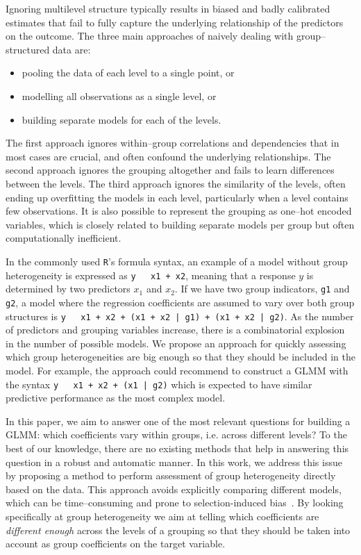 \documentclass{article}
\begin{document}
Ignoring multilevel structure typically results in biased and badly calibrated estimates that fail to fully capture the underlying relationship of the predictors on the outcome.
%
The three main approaches of naively dealing with group--structured data are:
\begin{itemize}[topsep=0pt,itemsep=2pt,partopsep=4pt, parsep=2pt]
    \item pooling the data of each level to a single point, or
    \item modelling all observations as a single level, or
    \item building separate models for each of the levels.
\end{itemize}
%
%
The first approach ignores within--group correlations and dependencies that in most cases are crucial, and often confound the underlying relationships.
The second approach ignores the grouping altogether and fails to learn differences between the levels.
The third approach ignores the similarity of the levels, often ending up overfitting the models in each level, particularly when a level contains few observations.
It is also possible to represent the grouping as one--hot encoded variables, which is closely related to building separate models per group but often computationally inefficient.

In the commonly used \texttt{R}'s formula syntax, an example of a model without group heterogeneity is expressed as \texttt{y \texttildelow \, x1 + x2}, meaning that a response $y$ is determined by two predictors $x_1$ and $x_2$. If we have two group indicators, \texttt{g1} and \texttt{g2}, a model where the regression coefficients are assumed to vary over both group structures is \texttt{y \texttildelow \, x1 + x2 + (x1 + x2 | g1) + (x1 + x2 | g2)}. As the number of predictors and grouping variables increase, there is a combinatorial explosion in the number of possible models.
We propose an approach for quickly assessing which group heterogeneities are big enough so that they should be included in the model. For example, the approach could recommend to construct a GLMM with the syntax
\texttt{y \texttildelow \, x1 + x2 + (x1 | g2)} which is expected to have similar predictive performance as the most complex model.

%
%
In this paper, we aim to answer one of the most relevant questions for building a GLMM: which coefficients vary within groups, i.e. across different levels? 
To the best of our knowledge, there are no existing methods that help in answering this question in a robust and automatic manner. %
In this work, we address this issue by proposing a method to perform assessment of group heterogeneity
directly based on the data.
This approach avoids explicitly comparing different models, which
%
can be time--consuming and prone to selection-induced bias~\cite{cawley2010over,wang2015difficulty}.
By looking specifically at group heterogeneity we aim at telling which coefficients are \emph{different enough} across the levels of a grouping so that they should be taken into account as group coefficients on the target variable.
%
%
\end{document}
